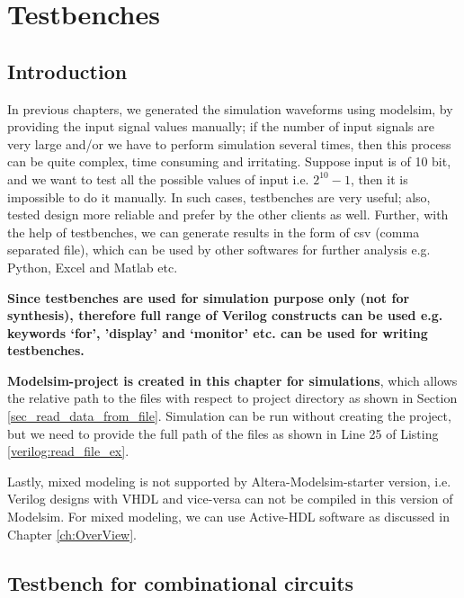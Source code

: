 \chapter{Testbenches} \label{ch:Testbenches}

\graphicspath{{Chapters/Testbenches/Figures/}}

\section{Introduction}

In previous chapters, we generated the simulation waveforms using modelsim, by providing the input signal values manually; if the number of input signals are very large and/or we have to perform simulation several times, then this process can be quite complex, time consuming and irritating. Suppose input is of 10 bit, and we want to test all the possible values of input i.e. $2^{10}-1$, then it is impossible to do it manually. In such cases, testbenches are very useful; also, tested design more reliable and prefer by the other clients as well. Further, with the help of testbenches, we can generate results in the form of csv (comma separated file), which can be used by other softwares for further analysis e.g. Python, Excel and Matlab etc.  

\textbf{Since testbenches are used for simulation purpose only (not for synthesis), therefore full range of Verilog constructs can be used e.g. keywords `for', 'display' and `monitor' etc. can be used for writing testbenches.}

\textbf{Modelsim-project is created in this chapter for simulations}, which allows the relative path to the files with respect to project directory as shown in Section \ref{sec_read_data_from_file}. Simulation can be run without creating the project, but we need to provide the full path of the files as shown in Line 25  of Listing \ref{verilog:read_file_ex}. 

Lastly, mixed modeling is not supported by Altera-Modelsim-starter version, i.e. Verilog designs with VHDL and vice-versa can not be compiled in this version of Modelsim. For mixed modeling, we can use Active-HDL software as discussed in Chapter \ref{ch:OverView}.

\section{Testbench for combinational circuits}

